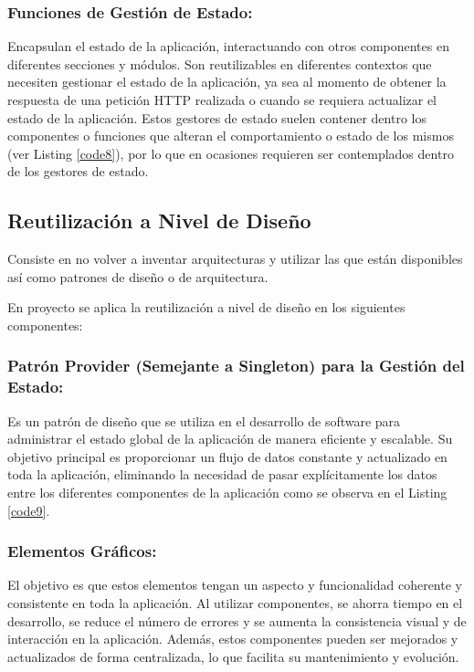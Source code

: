 \documentclass[runningheads]{llncs}
\begin{document}
            \subsubsection*{Funciones de Gestión de Estado:}
                Encapsulan el estado de la aplicación, interactuando con otros componentes en diferentes secciones y módulos. Son reutilizables en diferentes contextos que necesiten gestionar el estado de la aplicación, ya sea al momento de obtener la respuesta de una petición HTTP realizada o cuando se requiera actualizar el estado de la aplicación. Estos gestores de estado suelen contener dentro los componentes o funciones que alteran el comportamiento o estado de los mismos (ver Listing \ref{code8}), por lo que en ocasiones requieren ser contemplados dentro de los gestores de estado.
                


            \subsection*{Reutilización a Nivel de Diseño}
                Consiste en no volver a inventar arquitecturas y utilizar las que están disponibles así como patrones de diseño o de arquitectura.

                En proyecto se aplica la reutilización a nivel de diseño en los siguientes componentes:

            \subsubsection*{Patrón Provider (Semejante a Singleton) para la Gestión del Estado:}
                Es un patrón de diseño que se utiliza en el desarrollo de software para administrar el estado global de la aplicación de manera eficiente y escalable. Su objetivo principal es proporcionar un flujo de datos constante y actualizado en toda la aplicación, eliminando la necesidad de pasar explícitamente los datos entre los diferentes componentes de la aplicación como se observa en el Listing \ref{code9}.
                

            \subsubsection*{Elementos Gráficos: }
                El objetivo es que estos elementos tengan un aspecto y funcionalidad coherente y consistente en toda la aplicación. Al utilizar componentes, se ahorra tiempo en el desarrollo, se reduce el número de errores y se aumenta la consistencia visual y de interacción en la aplicación. Además, estos componentes pueden ser mejorados y actualizados de forma centralizada, lo que facilita su mantenimiento y evolución.
\end{document}
